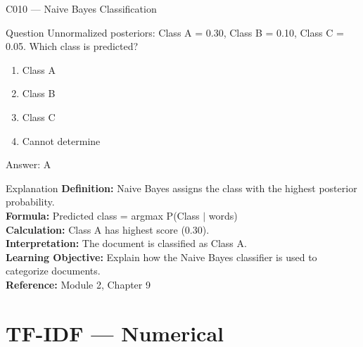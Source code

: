 \documentclass[aspectratio=169,8pt]{beamer}
\begin{document}
	\begin{frame}{C010 --- Naive Bayes Classification}
		\begin{block}{Question}
			Unnormalized posteriors: Class A = 0.30, Class B = 0.10, Class C = 0.05. Which class is predicted?
			\begin{enumerate}
				\item Class A
				\item Class B
				\item Class C
				\item Cannot determine
			\end{enumerate}
		\end{block}
		\begin{exampleblock}{Answer: A}\end{exampleblock}
		\begin{block}{Explanation}
			\textbf{Definition:} Naive Bayes assigns the class with the highest posterior probability.\\
			\textbf{Formula:} Predicted class = argmax P(Class $|$ words)\\
			\textbf{Calculation:} Class A has highest score (0.30).\\
			\textbf{Interpretation:} The document is classified as Class A.\\
			\textbf{Learning Objective:} Explain how the Naive Bayes classifier is used to categorize documents.\\
			\textbf{Reference:} Module 2, Chapter 9
		\end{block}
	\end{frame}
	
	\section{TF-IDF --- Numerical}
	
\end{document}
